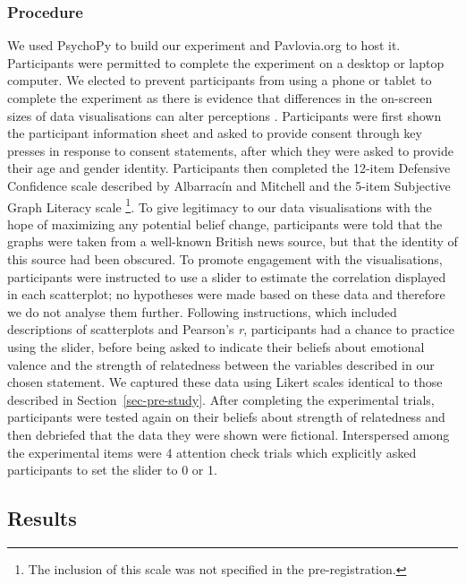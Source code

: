 \documentclass[sigconf]{acmart}
\begin{document}
\subsubsection{Procedure}\label{sec-procedure-main}

We used PsychoPy \citep{pierce_2019} to build our experiment and
Pavlovia.org to host it. Participants were permitted to complete the
experiment on a desktop or laptop computer. We elected to prevent
participants from using a phone or tablet to complete the experiment as
there is evidence that differences in the on-screen sizes of data
visualisations can alter perceptions \citep{cleveland_1982}.
Participants were first shown the participant information sheet and
asked to provide consent through key presses in response to consent
statements, after which they were asked to provide their age and gender
identity. Participants then completed the 12-item Defensive Confidence
scale described by Albarracín and Mitchell \citep{albarracin_2004} and
the 5-item Subjective Graph Literacy scale \citep{garcia_2016}
\footnote{The inclusion of this scale was not specified in the
  pre-registration.}. To give legitimacy to our data visualisations with
the hope of maximizing any potential belief change, participants were
told that the graphs were taken from a well-known British news source,
but that the identity of this source had been obscured. To promote
engagement with the visualisations, participants were instructed to use
a slider to estimate the correlation displayed in each scatterplot; no
hypotheses were made based on these data and therefore we do not analyse
them further. Following instructions, which included descriptions of
scatterplots and Pearson's \emph{r}, participants had a chance to
practice using the slider, before being asked to indicate their beliefs
about emotional valence and the strength of relatedness between the
variables described in our chosen statement. We captured these data
using Likert scales identical to those described in
Section~\ref{sec-pre-study}. After completing the experimental trials,
participants were tested again on their beliefs about strength of
relatedness and then debriefed that the data they were shown were
fictional. Interspersed among the experimental items were 4 attention
check trials which explicitly asked participants to set the slider to 0
or 1.

\subsection{Results}\label{sec-results-main}
\end{document}
